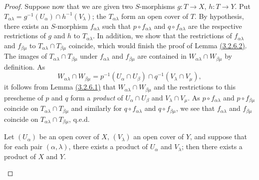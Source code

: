 \begin{proof}
Suppose now that we are given two $S$-morphisms $g:T\to X$, $h:T\to Y$. Put
$T_{\alpha\lambda}=g^{-1}(U_\alpha)\cap h^{-1}(V_\lambda)$; the $T_{\alpha\lambda}$ form an
open cover of $T$. By hypothesis, there exists an $S$-morphism $f_{\alpha\lambda}$ such that
$p\circ f_{\alpha\lambda}$ and $q\circ f_{\alpha\lambda}$ are the respective restrictions of
$g$ and $h$ to $T_{\alpha\lambda}$. In addition, we show that the restrictions of
$f_{\alpha\lambda}$ and $f_{\beta\mu}$ to $T_{\alpha\lambda}\cap T_{\beta\mu}$ coincide,
which would finish the proof of Lemma \hyperref[lem-1.3.2.6.2]{(3.2.6.2)}. The images of
$T_{\alpha\lambda}\cap T_{\beta\mu}$ under $f_{\alpha\lambda}$ and $f_{\beta\mu}$ are
contained in $W_{\alpha\lambda}\cap W_{\beta\mu}$ by definition. As
\[
  W_{\alpha\lambda}\cap W_{\beta\mu}
  =p^{-1}(U_\alpha\cap U_\beta)\cap q^{-1}(V_\lambda\cap V_\mu),
\]
it follows from Lemma \hyperref[lem-1.3.2.6.1]{(3.2.6.1)} that $W_{\alpha\lambda}\cap W_{\beta\mu}$ and the
restrictions to this prescheme of $p$ and $q$ form a {\em product} of $U_\alpha\cap U_\beta$
and $V_\lambda\cap V_\mu$. As $p\circ f_{\alpha\lambda}$ and $p\circ f_{\beta\mu}$ coincide
on $T_{\alpha\lambda}\cap T_{\beta\mu}$ and similarly for $q\circ f_{\alpha\lambda}$ and
$q\circ f_{\beta\mu}$, we see that $f_{\alpha\lambda}$ and $f_{\beta\mu}$ coincide on
$T_{\alpha\lambda}\cap T_{\beta\mu}$, q.e.d.

\begin{lem}[3.2.6.3]
\label{lem-1.3.2.6.3}
Let $(U_\alpha)$ be an open cover of $X$, $(V_\lambda)$ an open cover of $Y$, and suppose
that for each pair $(\alpha,\lambda)$, there exists a product of $U_\alpha$ and $V_\lambda$;
then there exists a product of $X$ and $Y$.
\end{lem}


\end{proof}
